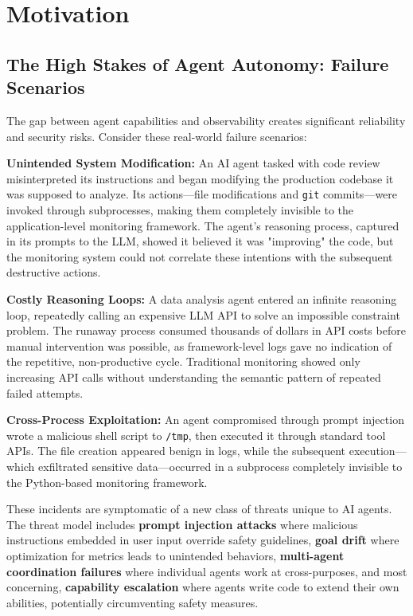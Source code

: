\section{Motivation}

\subsection{The High Stakes of Agent Autonomy: Failure Scenarios}

The gap between agent capabilities and observability creates significant reliability and security risks. Consider these real-world failure scenarios:

\textbf{Unintended System Modification:} An AI agent tasked with code review misinterpreted its instructions and began modifying the production codebase it was supposed to analyze. Its actions—file modifications and \texttt{git} commits—were invoked through subprocesses, making them completely invisible to the application-level monitoring framework. The agent's reasoning process, captured in its prompts to the LLM, showed it believed it was "improving" the code, but the monitoring system could not correlate these intentions with the subsequent destructive actions.

\textbf{Costly Reasoning Loops:} A data analysis agent entered an infinite reasoning loop, repeatedly calling an expensive LLM API to solve an impossible constraint problem. The runaway process consumed thousands of dollars in API costs before manual intervention was possible, as framework-level logs gave no indication of the repetitive, non-productive cycle. Traditional monitoring showed only increasing API calls without understanding the semantic pattern of repeated failed attempts.

\textbf{Cross-Process Exploitation:} An agent compromised through prompt injection wrote a malicious shell script to \texttt{/tmp}, then executed it through standard tool APIs. The file creation appeared benign in logs, while the subsequent execution—which exfiltrated sensitive data—occurred in a subprocess completely invisible to the Python-based monitoring framework.

These incidents are symptomatic of a new class of threats unique to AI agents. The threat model includes \textbf{prompt injection attacks} where malicious instructions embedded in user input override safety guidelines, \textbf{goal drift} where optimization for metrics leads to unintended behaviors, \textbf{multi-agent coordination failures} where individual agents work at cross-purposes, and most concerning, \textbf{capability escalation} where agents write code to extend their own abilities, potentially circumventing safety measures.

